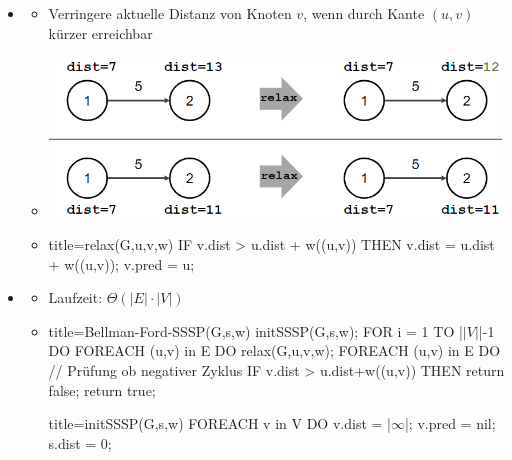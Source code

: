 \documentclass[
    ngerman,
    color=3b,
    dark_mode,
    load_common, %
    summary,
    boxarc,
]{tuda_summary}
\begin{document}
\begin{itemize}
    \item {}
          \begin{itemize}
              \item Verringere aktuelle Distanz von Knoten $v$, wenn durch Kante $(u,v)$ kürzer erreichbar
              \item[] \includegraphics[width=12cm]{pictures/ssspRelax.PNG}
              \item[]%
                    \begin{codeBlock}[autogobble]{title={relax(G,u,v,w)}}
                    IF v.dist > u.dist + w((u,v)) THEN
                        v.dist = u.dist + w((u,v));
                        v.pred = u;
                    \end{codeBlock}
          \end{itemize}
          \clearpage
    \item {}
          \begin{itemize}
              \item Laufzeit: $\Theta(|E| \cdot |V|)$
              \item[]%
                    \begin{codeBlock}[autogobble,escapeinside=||]{title={Bellman-Ford-SSSP(G,s,w)}}
                    initSSSP(G,s,w);
                    FOR i = 1 TO |$\vert V\vert$|-1 DO
                        FOREACH (u,v) in E DO
                            relax(G,u,v,w);
                    FOREACH (u,v) in E DO   // Prüfung ob negativer Zyklus
                        IF v.dist > u.dist+w((u,v)) THEN
                            return false;
                    return true;
                    \end{codeBlock}
                    \begin{codeBlock}[autogobble,escapeinside=||]{title={initSSSP(G,s,w)}}
                    FOREACH v in V DO
                        v.dist = |$\infty$|;
                        v.pred = nil;
                    s.dist = 0;
                    \end{codeBlock}
          \end{itemize}


\end{itemize}
\end{document}
